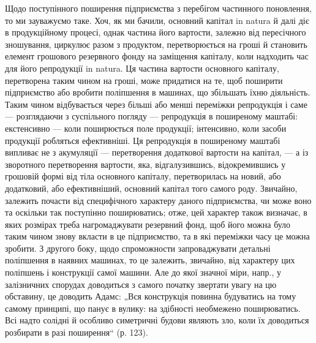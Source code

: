 Щодо поступінного поширення підприємства з перебігом частинного поновлення, то ми зауважуємо таке.
Хоч, як ми бачили, основний капітал in natura й далі діє в продукційному процесі, однак частина його
вартости, залежно від пересічного зношування, циркулює разом з продуктом, перетворюється на гроші й
становить елемент грошового резервного фонду на заміщення капіталу, коли надходить час для його
репродукції in natura. Ця частина вартости основного капіталу, перетворена таким
чином на гроші, може придатися на те, щоб поширити підприємство або вробити поліпшення в машинах, що
збільшать їхню діяльність. Таким чином відбувається через більші або менші переміжки репродукція і
саме — розглядаючи з суспільного погляду — репродукція в поширеному маштабі: екстенсивно — коли
поширюється поле продукції; інтенсивно, коли засоби продукції робляться ефективніші. Ця репродукція
в поширеному маштабі випливає не з акумуляції — перетворення додаткової вартости на капітал, — а із
зворотного перетворення вартости, яка, відгалузившись, відокремившись у грошовій формі від тіла
основного капіталу, перетворилась на новий, або додатковий, або ефективніший, основний капітал того
самого роду. Звичайно, залежить почасти від специфічного характеру даного підприємства, чи може воно
та оскільки так поступінно поширюватись; отже, цей характер також визначає, в яких розмірах треба
нагромаджувати резервний фонд, щоб його можна було таким чином знову вкласти в це підприємство, та в
які переміжки часу це можна зробити. З другого боку, щодо спроможности запроваджувати детальні
поліпшення в наявних машинах, то це залежить, звичайно, від характеру цих поліпшень і конструкції
самої машини. Але до якої значної міри, напр., у залізничних спорудах доводиться з самого початку
звертати увагу на цю обставину, це доводить Адамс: „Вся конструкція повинна будуватись на тому
самому принципі, що панує в вулику: на здібності необмежено поширюватись. Всі надто солідні й
особливо симетричні будови являють зло, коли їх доводиться розбирати в разі поширення“ (р. 123).
